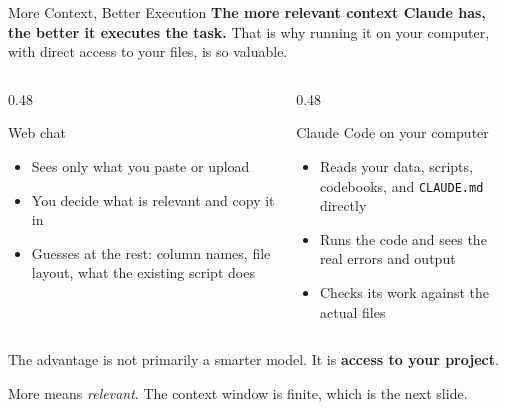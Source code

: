 \documentclass[aspectratio=169, 11pt]{beamer}
\begin{document}
\begin{frame}{More Context, Better Execution}
  \textbf{The more relevant context Claude has, the better it executes the task.} That is why running it on your computer, with direct access to your files, is so valuable.

  \vspace{0.5em}
  \begin{columns}[T]
    \begin{column}{0.48\textwidth}
      \begin{block}{Web chat}
        \begin{itemize}
          \item Sees only what you paste or upload
          \item You decide what is relevant and copy it in
          \item Guesses at the rest: column names, file layout, what the existing script does
        \end{itemize}
      \end{block}
    \end{column}
    \begin{column}{0.48\textwidth}
      \begin{alertblock}{Claude Code on your computer}
        \begin{itemize}
          \item Reads your data, scripts, codebooks, and \texttt{CLAUDE.md} directly
          \item Runs the code and sees the real errors and output
          \item Checks its work against the actual files
        \end{itemize}
      \end{alertblock}
    \end{column}
  \end{columns}

  \vspace{0.5em}
  The advantage is not primarily a smarter model. It is \textbf{access to your project}.

  \vspace{0.3em}
  {\small More means \emph{relevant}. The context window is finite, which is the next slide.}
\end{frame}


\end{document}
